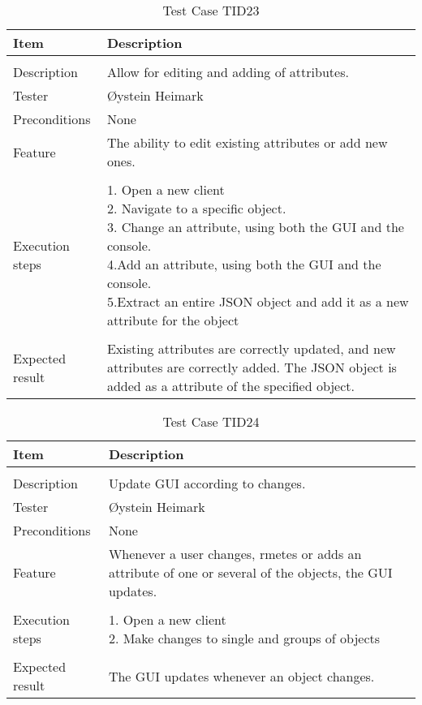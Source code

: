 \begin{table}[H]
\caption{Test Case TID23}
\centering
\begin{tabular}{ l p{13cm} }
\hline
 Item            & Description        \\
\hline \\ [-2.0ex]
 Description     &Allow for editing and adding of attributes. \\
 Tester          & Øystein Heimark                  \\
 Preconditions   & None\\
 Feature         & The ability to edit existing attributes or add new ones.   \vspace{3pt}                     \\
\hline \\ [-1.5ex]
 Execution steps & \pbox{13cm}{1. Open a new client \\ 2. Navigate to a specific object. \\ 3. Change an attribute, using both the GUI and the console. \\ 4.Add an attribute, using both the GUI and the console. \\ 5.Extract an entire JSON object and add it as a new attribute for the object } \vspace{3pt} \\
\hline \\ [-1.5ex]
 Expected result & Existing attributes are correctly updated, and new attributes are correctly added. The JSON object is added as a attribute of the specified object. \\
\hline
\end{tabular}
\label{table:testcasetid23}
\end{table}


\begin{table}[H]
\caption{Test Case TID24}
\centering
\begin{tabular}{ l p{13cm} }
\hline
 Item            & Description        \\
\hline \\ [-2.0ex]
 Description     &Update GUI according to changes. \\
 Tester          & Øystein Heimark                  \\
 Preconditions   & None\\
 Feature         & Whenever a user changes, rmetes or adds an attribute of one or several of the objects, the GUI updates.   \vspace{3pt}                     \\
\hline \\ [-1.5ex]
 Execution steps & \pbox{13cm}{1. Open a new client \\ 2. Make changes to single and groups of objects} \vspace{3pt} \\
\hline \\ [-1.5ex]
 Expected result & The GUI updates whenever an object changes. \\
\hline
\end{tabular}
\label{table:testcasetid24}
\end{table}

